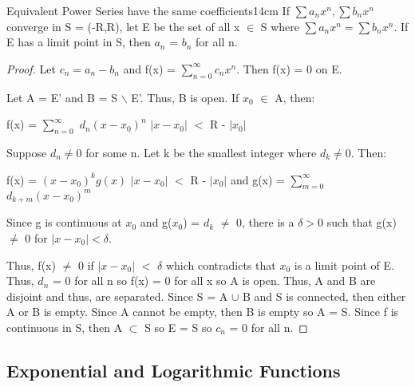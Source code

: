     \vspace{0.5cm}



    \begin{wtheorem}{Equivalent Power Series have the same coefficients}{14cm}
        If $\sum a_n x^n, \sum b_nx^n$ converge in S = (-R,R), let E be the
        set of all x $\in$ S where $\sum a_n x^n = \sum b_nx^n$.
        If E has a limit point in S, then $a_n$ = $b_n$ for all n.
    \end{wtheorem}

    \begin{proof}
        Let $c_n = a_n - b_n$ and f(x) = $\sum_{n=0}^{\infty} c_n x^n$.
        Then f(x) = 0 on E.

        Let A = E' and B = S $\backslash$ E'.
        Thus, B is open.
        If $x_0$ $\in$ A, then:

        \hspace{0.5cm}
        f(x) = $\sum_{n=0}^{\infty}$ $d_n(x - x_0)^n$
        \hspace{1cm}
        $|x-x_0|$ $<$ R - $|x_0|$
        
        Suppose $d_n \not = 0$ for some n. Let k be the smallest integer where
        $d_k \not = 0$. Then:
        
        \hspace{0.5cm}
        f(x) = $(x- x_0)^k g(x)$
        \hspace{1cm}
        $|x-x_0|$ $<$ R - $|x_0|$
        and g(x) = $\sum_{m=0}^{\infty}$ $d_{k+m}(x-x_0)^m$

        Since g is continuous at $x_0$ and g($x_0$) = $d_k$ $\not =$ 0,
        there is a $\delta > 0$ such that g(x) $\not =$ 0 for $|x - x_0| < \delta$.

        Thus, f(x) $\not =$ 0 if $|x-x_0|$ $<$ $\delta$ which contradicts
        that $x_0$ is a limit point of E.
        Thus, $d_n$ = 0 for all n so f(x) = 0 for all x so A is open.
        Thus, A and B are disjoint and thus, are separated.
        Since S = A $\cup$ B and S is connected, then either A or B is empty.
        Since A cannot be empty, then B is empty so A = S.
        Since f is continuous in S, then A $\subset$ S so E = S so $c_n$ = 0
        for all n.
    \end{proof}

    \newpage





\subsection{ Exponential and Logarithmic Functions }

